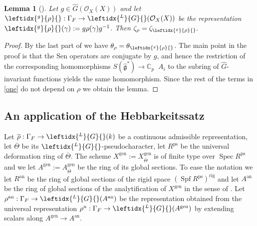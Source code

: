 \documentclass{amsart}
\newtheorem{lem}[prop]{Lemma}
\theoremstyle{definition}
\theoremstyle{remark}
\DeclareMathOperator{\Spec}{Spec}
\newcommand{\OO}{\mathcal O}
\DeclareMathOperator{\wtimes}{\widehat{\otimes}}
\newcommand{\ana}{\mathrm{an}}
\newcommand{\rhobar}{\overline{\rho}}
\newcommand{\gen}{\mathrm{gen}}
\DeclareMathOperator{\Spf}{Spf}
\newcommand{\rig}{\mathrm{rig}}
\newcommand{\Thetabar}{\overline{\Theta}}
\newcommand{\Cp}{\mathbb C_p}
\newcommand{\ps}{\mathrm{ps}}
\newcommand{\Ghat}{\widehat{G}}
\newcommand{\LG}{\leftidx{^L}{G}{}}
\newcommand{\ghat}{\widehat{\mathfrak g}}
\newcommand{\grho}{\leftidx{^g}{\rho}{}}
\begin{document}
\begin{lem}[\cite{DPS}]\label{conj_same} Let $g\in \Ghat(\OO_X(X))$ and 
let $\leftidx{^g}{\rho}{}:\Gamma_F \rightarrow \LG(\OO_X(X))$
be the representation $\leftidx{^g}{\rho}{}(\gamma):= g \rho(\gamma)g^{-1}$. Then $\zeta_{\rho}= \zeta_{\leftidx{^g}{\rho}{}}.$
\end{lem}
\begin{proof} By the last part of \cite[Lemma 4.10]{DPS} 
we have $\theta_{\rho}= \theta_{\grho}$. The main  
point in the proof is that the Sen operators are conjugate by $g$, 
and hence the restriction of the corresponding homomorphisms 
$S(\ghat^*)\rightarrow \Cp\wtimes A_i$
to the subring of $\Ghat$-invariant functions yields 
the same homomorphism. Since the rest of the terms 
in \eqref{one} do not depend on $\rho$ we obtain the lemma.  
\end{proof}
\subsection{An application of the  Hebbarkeitssatz}
Let $\rhobar: \Gamma_F \rightarrow \LG(k)$
be a continuous admissible representation,
let $\Thetabar$ be its  $\LG$-pseudocharacter, let $R^{\ps}$ be the
universal deformation ring of $\Thetabar$. The scheme 
$X^{\gen}:=X^{\gen}_{\Thetabar}$ is of finite type over $\Spec R^{\ps}$ and we let $A^{\gen}:=A^{\gen}_{\Thetabar}$ be the ring of its global sections. To ease the notation we let $R^{\ana}$ be the ring of global sections of the 
rigid space $(\Spf R^{\ps})^{\rig}$ and let $A^{\ana}$ 
be the ring of global sections of the analytification 
of $X^{\gen}$ in the sense of
. Let $\rho^{\ana}: \Gamma_F \rightarrow 
\LG(A^{\ana})$ be the representation obtained from the
universal representation 
$\rho^{u}: \Gamma_F \rightarrow 
\LG(A^{\gen})$
by extending scalars along $ A^{\gen}\rightarrow A^{\ana}$.
\end{document}

